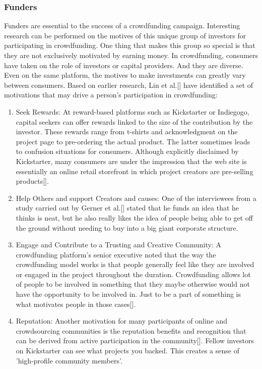 \subsubsection*{Funders}
Funders are essential to the success of a crowdfunding campaign. Interesting research can be performed on the motives of this unique group of investors for participating in crowdfunding. One thing that
makes this group so special is that they are not exclusively motivated by earning money.
In crowdfunding, consumers have taken on the role of investors or capital providers. And they are diverse. Even on the same platform, the motives to make investments can greatly vary between consumers.
Based on earlier research, Lin et al.[\cite{doi:10.5465/ambpp.2014.209}] have identified a set of motivations that may drive a person’s participation in crowdfunding:

\begin{enumerate}
      \item Seek Rewards:
            At reward-based platforms such as Kickstarter or Indiegogo, capital seekers can offer rewards linked to the size of the contribution by the investor. These rewards range from t-shirts and
            acknowledgment on the project page to pre-ordering the actual product. The latter sometimes leads
            to confusion situations for consumers. Although explicitly disclaimed by Kickstarter, many consumers
            are under the impression that the web site is essentially an online retail storefront in which project
            creators are pre-selling products[\cite{10.2139/ssrn.2234765}].

      \item Help Others and support Creators and causes: One of the interviewees from a study carried out by Gerner et al.[\cite{inproceedings}]
            stated that he funds an idea that he thinks is neat, but he also really likes the idea of people being
            able to get off the ground without needing to buy into a big giant corporate structure.

      \item Engage and Contribute to a Trusting and Creative Community:
            A crowdfunding platform’s senior executive noted that the way the crowdfunding model works is that people generally feel like they are involved or engaged in the project
            throughout the duration. Crowdfunding allows lot of people to be involved in something that
            they maybe otherwise would not have the opportunity to be involved in. Just to be a part of something
            is what motivates people in those cases[\cite{inproceedings}].

      \item Reputation:
            Another motivation for many participants of online and crowdsourcing communities is
            the reputation benefits and recognition that can be derived from active participation in the community[\cite{doi:10.5465/ambpp.2014.209}].
            Fellow investors on Kickstarter can see what projects you backed. This creates a sense of ’high-profile
            community members’.
\end{enumerate}


